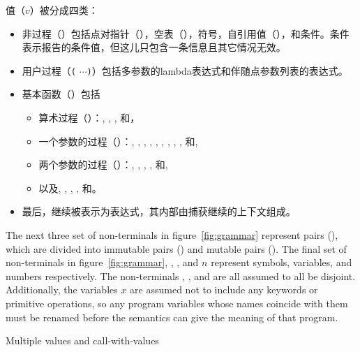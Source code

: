值（$v$）被分成四类：
%
\begin{itemize}
\item 非过程（）包括点对指针（），空表（），符号，自引用值（），和条件。条件表示报告的条件值，但这儿只包含一条信息且其它情况无效。
\item 用户过程（\texttt{(}    $\cdots$\texttt{)}）包括多参数的lambda表达式和伴随点参数列表的表达式。
\item 基本函数（）包括

\begin{itemize}
\item
 算术过程（）：\va{+}, \va{-}, \va{/}, 和\va{*}，
\item
 一个参数的过程（）：, , , , , , , , , 和,
\item
 两个参数的过程（）：, , , , 和,
\item
 以及, , , , 和。
\end{itemize}
\item 最后，继续被表示为表达式，其内部由捕获继续的上下文组成。
\end{itemize}
%
The next three set of non-terminals in figure~\ref{fig:grammar} represent pairs (), which are divided into immutable pairs () and mutable pairs (). The final set of non-terminals in figure~\ref{fig:grammar}, ,
, and $n$ represent symbols, variables, and
numbers respectively. The non-terminals , , and  are all assumed to all be disjoint. Additionally, the variables $x$ are assumed not to include any keywords or primitive operations, so any program variables whose names coincide with them must be renamed before the semantics can give the meaning of that program.

\beginfig
\begin{center}

\end{center}
\caption{Multiple values and call-with-values}\label{fig:Multiple--values--and--call-with-values}
\endfig

